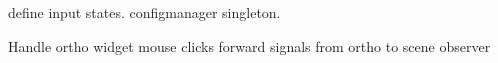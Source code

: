 define input states. configmanager singleton. 


Handle ortho widget mouse clicks
forward signals from ortho to scene observer




% 
% 
% 
% 
% 
